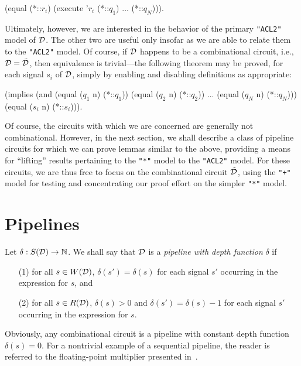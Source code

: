 \documentclass{article}
\begin{document}
\begin{acl2}
(equal (*::$r_i$) (execute '$r_i$ (*::$q_1$) $\ldots$ (*::$q_N$))).
\end{acl2}
\indent Ultimately, however, we are interested in the behavior of the
primary \verb!"ACL2"! model of ${\cal D}$.  The other two are useful
only insofar as we are able to relate them to the \verb!"ACL2"! model.
Of course, if ${\cal D}$ happens to be a combinational circuit, i.e.,
${\cal D} = \tilde{\cal D}$, then equivalence is trivial---the
following theorem may be proved, for each signal $s_i$ of ${\cal D}$,
simply by enabling and disabling definitions as appropriate:\medskip

\begin{acl2}
(implies (and (equal ($q_1$ n) (*::$q_1$))
              (equal ($q_2$ n) (*::$q_2$))
              ...
              (equal ($q_N$ n) (*::$q_N$)))
         (equal ($s_i$ n) (*::$s_i$))).
\end{acl2}\noindent
Of course, the circuits with which we are concerned are
generally not combinational.  However, in the next section, we shall
describe a class of pipeline circuits for which we can prove lemmas
similar to the above, providing a means for ``lifting'' results
pertaining to the \verb!"*"! model to the \verb!"ACL2"! model.  For
these circuits, we are thus free to focus on the combinational circuit
$\tilde{\cal D}$, using the \verb!"+"! model for testing and
concentrating our proof effort on the simpler \verb!"*"! model.


\section{Pipelines}\label{pipes}

Let $\delta : S({\cal D}) \rightarrow {\mathbb N}$.  We shall say
that ${\cal D}$ is a {\it pipeline with depth function} $\delta$ if
\begin{enumerate}

\item[(1)] for all $s \in W({\cal D})$, $\delta(s') = \delta(s)$ for
each signal $s'$ occurring in the expression for $s$, and

\item[(2)] for all $s \in R({\cal D})$, $\delta(s) > 0$ and $\delta(s') = \delta(s)-1$ for
each signal $s'$ occurring in the expression for $s$.
\end{enumerate}

Obviously, any combinational circuit is a pipeline with constant depth
function $\delta(s) = 0$.  For a nontrivial example of a sequential
pipeline, the reader is referred to the floating-point multiplier
presented in~\cite{mult}.
\end{document}

